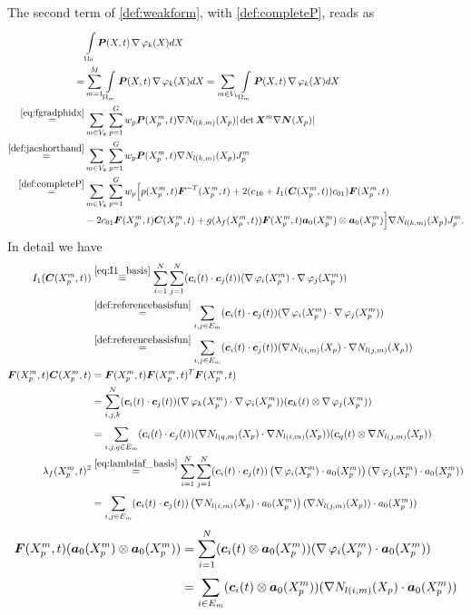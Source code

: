 The second term of \eqref{def:weakform}, with \eqref{def:completeP}, reads as
\begin{align*}
		&\intor\vP(X,t)\divergence\varphi_k(X) dX\\
		=& \suml{m=1}{M}\intl{\Omega_m}{}\vP(X,t)\divergence\varphi_k(X) dX
			= \sumvk\intl{\Omega_m}{}\vP(X,t)\divergence\varphi_k(X) dX\\
		\re{eq:fgradphidx}&\sumvk\sumgp w_p\vP(\pmp,t)\nabla N_{l(k,m)}(X_p)|\det \vX^m\nabla\vN(X_p)|\\
		\re{def:jacshorthand}&\sumvk\sumgp w_p\vP(\pmp,t)\nabla N_{l(k,m)}(X_p)\jmp\\
		\re{def:completeP}&\sumvk\sumgp w_p\Bigl[p(\pmp,t)\vF^{-T}(\pmp,t) + 2(c_{10} + I_1(\vC(\pmp,t))c_{01})\vF(\pmp,t)\\
			 &- 2c_{01}\vF(\pmp,t)\vC(\pmp,t)+g(\lambda_f(\pmp,t))\vF(\pmp,t)\va_0(\pmp)\otimes\va_0(\pmp)\Bigr]\nabla N_{l(k,m)}(X_p)\jmp\nonumber.
\end{align*}
In detail we have
\begin{align*}
	I_1(\vC(\pmp,t)) &\re{eq:I1_basis} \sumi\sumj (\vc_i(t) \cdot \vc_j(t))(\divergence\varphi_i(\pmp) \cdot \divergence\varphi_j(\pmp))\\
	&\re{def:referencebasisfun} \suml{i,j\in E_m}{} (\vc_i(t) \cdot \vc_j(t))(\divergence\varphi_i(\pmp) \cdot \divergence\varphi_j(\pmp))\\
	&\re{def:referencebasisfun} \suml{i,j\in E_m}{} (\vc_i(t) \cdot \vc_j(t))(\nabla N_{l(i,m)}(X_p) \cdot \nabla N_{l(j,m)}(X_p))\\
	\vF(\pmp,t)\vC(\pmp,t) &= \vF(\pmp,t)\vF(\pmp,t)^T\vF(\pmp,t)\\
    	&= \suml{i,j,k}{N}(\vc_i(t)\cdot \vc_j(t))(\divergence\varphi_k(\pmp)\cdot\divergence\varphi_i(\pmp))(\vc_k(t)\otimes\divergence\varphi_j(\pmp))\\
    	&= \suml{i,j,q\in E_m}{}(\vc_i(t)\cdot \vc_j(t))(\nabla N_{l(q,m)}(X_p)\cdot\nabla N_{l(i,m)}(X_p))(\vc_q(t)\otimes\nabla N_{l(j,m)}(X_p))\\
    \lambda_f(\pmp,t)^2 &\re{eq:lambdaf_basis}
    		\sumi\sumj (\vc_i(t)\cdot \vc_j(t))\left(\divergence\varphi_i(\pmp)\cdot a_0(\pmp)\right)(\divergence\varphi_j(\pmp)\cdot a_0(\pmp))\nonumber\\
    	&= \suml{i,j\in E_m}{} (\vc_i(t)\cdot \vc_j(t))\left(\nabla N_{l(i,m)}(X_p)\cdot a_0(\pmp)\right)(\nabla N_{l(j,m)}(X_p))\cdot a_0(\pmp))\nonumber
\end{align*} 
\begin{align*}  	
    \boldsymbol{F}(X^m_p,t)(\boldsymbol{a}_0(X^m_p)\otimes\boldsymbol{a}_0(X^m_p)) 
    	&= \sum\limits_{i=1}^{N} (\boldsymbol{c}_i(t)\otimes \boldsymbol{a}_0(X^m_p))(\operatorname{\nabla}\varphi_i(X^m_p)\cdot\boldsymbol{a}_0(X^m_p))\nonumber\\
    	&= \sum\limits_{i\in E_m}^{} (\boldsymbol{c}_i(t)\otimes \boldsymbol{a}_0(X^m_p))(\nabla N_{l(i,m)}(X_p)\cdot\boldsymbol{a}_0(X^m_p))\nonumber
\end{align*}
